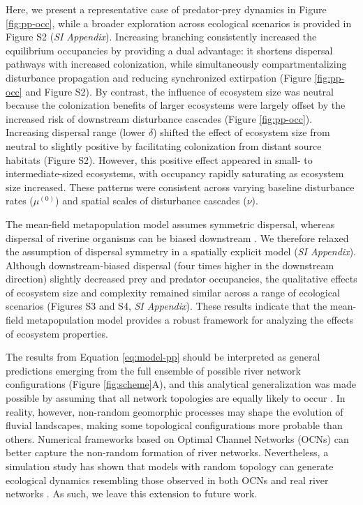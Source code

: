\documentclass[9pt,twocolumn,twoside]{pnas-new}
\begin{document}
Here, we present a representative case of predator-prey dynamics in Figure \ref{fig:pp-occ}, while a broader exploration across ecological scenarios is provided in Figure S2 (\textit{SI Appendix}). 
Increasing branching consistently increased the equilibrium occupancies by providing a dual advantage: it shortens dispersal pathways with increased colonization, while simultaneously compartmentalizing disturbance propagation and reducing synchronized extirpation (Figure \ref{fig:pp-occ} and Figure S2). 
By contrast, the influence of ecosystem size was neutral because the colonization benefits of larger ecosystems were largely offset by the increased risk of downstream disturbance cascades (Figure \ref{fig:pp-occ}). 
Increasing dispersal range (lower $\delta$) shifted the effect of ecosystem size from neutral to slightly positive by facilitating colonization from distant source habitats (Figure S2). 
However, this positive effect appeared in small- to intermediate-sized ecosystems, with occupancy rapidly saturating as ecosystem size increased.
These patterns were consistent across varying baseline disturbance rates ($\mu^{(0)}$) and spatial scales of disturbance cascades ($\nu$). 

The mean-field metapopulation model assumes symmetric dispersal, whereas dispersal of riverine organisms can be biased downstream \citep[e.g.,][]{terui_asymmetric_2014}. 
We therefore relaxed the assumption of dispersal symmetry in a spatially explicit model (\textit{SI Appendix}). 
Although downstream-biased dispersal (four times higher in the downstream direction) slightly decreased prey and predator occupancies, the qualitative effects of ecosystem size and complexity remained similar across a range of ecological scenarios (Figures S3 and S4, \textit{SI Appendix}). 
These results indicate that the mean-field metapopulation model provides a robust framework for analyzing the effects of ecosystem properties.

The results from Equation \ref{eq:model-pp} should be interpreted as general predictions emerging from the full ensemble of possible river network configurations (Figure \ref{fig:scheme}A), and this analytical generalization was made possible by assuming that all network topologies are equally likely to occur \citep{shreve_infinite_1967}. 
In reality, however, non-random geomorphic processes may shape the evolution of fluvial landscapes, making some topological configurations more probable than others.
Numerical frameworks based on Optimal Channel Networks (OCNs) \citep{rodriguez-iturbe_fractal_2001} can better capture the non-random formation of river networks. 
Nevertheless, a simulation study has shown that models with random topology can generate ecological dynamics resembling those observed in both OCNs and real river networks \citep{lee_network_2022}. 
As such, we leave this extension to future work.
\end{document}
